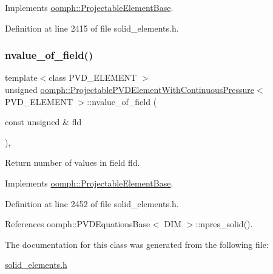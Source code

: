 Implements \hyperlink{classoomph_1_1ProjectableElementBase_ac6790f394630b964663281f8740f43a5}{oomph\+::\+Projectable\+Element\+Base}.



Definition at line 2415 of file solid\+\_\+elements.\+h.

\mbox{\label{classoomph_1_1ProjectablePVDElementWithContinuousPressure_a2705856446a53ee4e3944ae8b5006391}} 
\subsubsection{\texorpdfstring{nvalue\+\_\+of\+\_\+field()}{nvalue\_of\_field()}}
{\footnotesize\ttfamily template$<$class P\+V\+D\+\_\+\+E\+L\+E\+M\+E\+NT $>$ \\
unsigned \hyperlink{classoomph_1_1ProjectablePVDElementWithContinuousPressure}{oomph\+::\+Projectable\+P\+V\+D\+Element\+With\+Continuous\+Pressure}$<$ P\+V\+D\+\_\+\+E\+L\+E\+M\+E\+NT $>$\+::nvalue\+\_\+of\+\_\+field (\begin{DoxyParamCaption}\item[{const unsigned \&}]{fld }\end{DoxyParamCaption})\hspace{0.3cm}{\ttfamily [inline]}, {\ttfamily [virtual]}}



Return number of values in field fld. 



Implements \hyperlink{classoomph_1_1ProjectableElementBase_a1a9a6de16f3511bca8e8be770abb9c2e}{oomph\+::\+Projectable\+Element\+Base}.



Definition at line 2452 of file solid\+\_\+elements.\+h.



References oomph\+::\+P\+V\+D\+Equations\+Base$<$ D\+I\+M $>$\+::npres\+\_\+solid().



The documentation for this class was generated from the following file\+:\begin{DoxyCompactItemize}
\item 
\hyperlink{solid__elements_8h}{solid\+\_\+elements.\+h}\end{DoxyCompactItemize}
